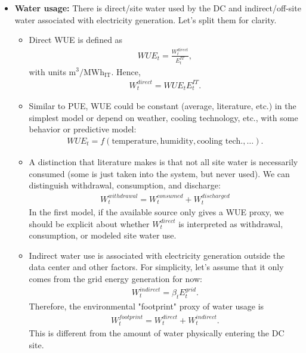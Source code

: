 \documentclass{article}
\begin{document}
\begin{itemize}
    \item \textbf{Water usage:} There is direct/site water used by the DC and indirect/off-site water associated with electricity generation. Let's split them for clarity.
    \begin{itemize}
        \item Direct WUE is defined as
        \begin{align*}
            WUE_t=\frac{W_t^{direct}}{E_t^{IT}},
        \end{align*}
        with units $\mathrm{m^3/MWh_{IT}}$.
        Hence,
        \begin{align*}
            W_t^{direct}=WUE_t E_t^{IT}.
        \end{align*}
        \item Similar to PUE, WUE could be constant (average, literature, etc.) in the simplest model or depend on weather, cooling technology, etc., with some behavior or predictive model:
        \begin{align*}
            WUE_t=f(\text{temperature},\text{humidity},\text{cooling tech.},\ldots).
        \end{align*}
        \item A distinction that literature makes is that not all site water is necessarily consumed (some is just taken into the system, but never used). We can distinguish withdrawal, consumption, and discharge:
        \begin{align*}
            W_t^{withdrawal}=W_t^{consumed}+W_t^{discharged} %
        \end{align*}
        In the first model, if the available source only gives a WUE proxy, we should be explicit about whether $W_t^{direct}$ is interpreted as withdrawal, consumption, or modeled site water use.
        \item Indirect water use is associated with electricity generation outside the data center and other factors.  For simplicity, let's assume that it only comes from the grid energy generation  for now:
        \begin{align*}
            W_t^{indirect}=\beta_tE_t^{grid}.
        \end{align*}
        Therefore, the environmental "footprint" proxy of water usage is
        \begin{align*}
            W_t^{footprint}=W_t^{direct}+W_t^{indirect}.
        \end{align*}
        This is different from the amount of water physically entering the DC site.
    \end{itemize}


\end{itemize}
\end{document}
